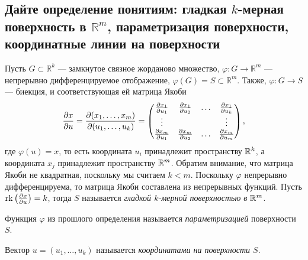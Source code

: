 
\subsection{Дайте определение понятиям: гладкая $k$-мерная поверхность в $\mathbb{R}^{m}$, параметризация поверхности, координатные линии на поверхности}

\begin{definition}
    Пусть $G \subset \mathbb{R}^{k}$ --- замкнутое связное жорданово множество, $\varphi \colon G \to \mathbb{R}^{m}$ --- непрерывно дифференцируемое отображение, $\varphi(G) = S \subset \mathbb{R}^{m}$.
    Также, $\varphi \colon G \to S$ --- биекция, и соответствующая ей матрица Якоби
    \[
        \pdv{x}{u} = \pdv{(x_{1}, \ldots, x_{m})}{(u_{1}, \ldots, u_{k})} = \begin{pmatrix}
            \pdv{x_{1}}{u_{1}} & \pdv{x_{1}}{u_{2}} & \ldots & \pdv{x_{1}}{u_{k}} \\
            \vdots & & & \vdots \\
            \pdv{x_{m}}{u_{1}} & \pdv{x_{m}}{u_{2}} & \ldots & \pdv{x_{m}}{u_{m}}
        \end{pmatrix},
    \]
    где $\varphi(u) = x$, то есть координата $u_{i}$ принадлежит пространству $\mathbb{R}^{k}$, а координата $x_{j}$ принадлежит пространству $\mathbb{R}^{m}$.
    Обратим внимание, что матрица Якоби не квадратная, поскольку мы считаем $k < m$.
    Поскольку $\varphi$ непрерывно дифференцируема, то матрица Якоби составлена из непрерывных функций.
    Пусть $\rk\pqty{\pdv{x}{u}} = k$, тогда $S$ называется {\it гладкой $k$-мерной поверхностью в $\mathbb{R}^{m}$}.
\end{definition}

\begin{definition}
    Функция $\varphi$ из прошлого определения называется {\it параметризацией} поверхности $S$.
\end{definition}

\begin{definition}
    Вектор $u = (u_{1}, \ldots, u_{k})$ называется {\it координатами на поверхности $S$}.
\end{definition}




